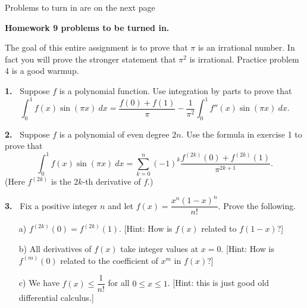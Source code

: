 \documentclass[12pt]{article}
\theoremstyle{definition}
\theoremstyle{remark}
\theoremstyle{definition}
\begin{document}


\vskip10pt
Problems to turn in are on the next page
\newpage

{\bf Homework 9 problems to be turned in.}

The goal of this entire assignment is to prove that $\pi$ is an irrational number. In fact you will prove the stronger statement that $\pi^2$ is irrational. Practice problem 4 is a good warmup.


{\bf 1.\ } Suppose $f$ is a polynomial function. Use integration by parts to prove that 
\[\int_0^1 f(x)\sin(\pi x)\ dx=\frac{f(0)+f(1)}{\pi}-\frac{1}{\pi^2}\int_0^1f''(x)\sin(\pi x)\ dx.
\]

{\bf 2.\ } Suppose $f$ is a polynomial  of even degree $2n$.   Use the formula in exercise 1 to prove that 
\[\int_0^1 f(x)\sin(\pi x)\ dx=\sum_{k=0}^{n}(-1)^k\frac{f^{(2k)}(0)+f^{(2k)}(1)}{\pi^{2k+1}}.\]
(Here $f^{(2k)}$ is the $2k$-th derivative of $f$.)



{\bf 3.\ } Fix a positive integer $n$ and let 
$f(x)=\dfrac{x^n(1-x)^n}{n!}$. 
Prove the following. 
\begin{itemize}
\item[a)] 
$f^{(2k)}(0)=f^{(2k)}(1)$. [Hint: How is $f(x)$ related to $f(1-x)$?]
\item[b)]  All derivatives of $f(x)$ take integer values at $x=0$. 
[Hint: How is $f^{(m)}(0)$ related to the coefficient of $x^{m}$ in $f(x)$?]
\item[c)] We have $f(x)\leq \dfrac{1}{n!}$ for all $0\leq x\leq 1$. [Hint: this is just good old differential calculus.]
\end{itemize}
\end{document}
